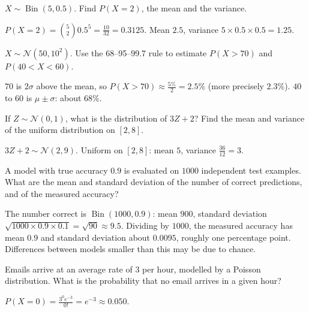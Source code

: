 \sectionexercises

\begin{exercise}
$X \sim \operatorname{Bin}(5, 0.5)$. Find $P(X = 2)$, the mean and the variance.
\end{exercise}
\begin{solution}
$P(X = 2) = \binom52 0.5^5 = \tfrac{10}{32} = 0.3125$. Mean $2.5$, variance
$5\times0.5\times0.5 = 1.25$.
\end{solution}

\begin{exercise}
$X \sim \mathcal{N}(50, 10^2)$. Use the 68--95--99.7 rule to estimate $P(X > 70)$
and $P(40 < X < 60)$.
\end{exercise}
\begin{solution}
$70$ is $2\sigma$ above the mean, so $P(X > 70) \approx \tfrac{5\%}{2} = 2.5\%$
(more precisely $2.3\%$). $40$ to $60$ is $\mu \pm \sigma$: about $68\%$.
\end{solution}

\begin{exercise}
If $Z \sim \mathcal{N}(0, 1)$, what is the distribution of $3Z + 2$? Find the mean
and variance of the uniform distribution on $[2, 8]$.
\end{exercise}
\begin{solution}
$3Z + 2 \sim \mathcal{N}(2, 9)$. Uniform on $[2, 8]$: mean $5$, variance
$\tfrac{36}{12} = 3$.
\end{solution}

\begin{exercise}
A model with true accuracy $0.9$ is evaluated on $1000$ independent test
examples. What are the mean and standard deviation of the number of correct
predictions, and of the measured accuracy?
\end{exercise}
\begin{solution}
The number correct is $\operatorname{Bin}(1000, 0.9)$: mean $900$, standard
deviation $\sqrt{1000\times0.9\times0.1} = \sqrt{90} \approx 9.5$. Dividing by
$1000$, the measured accuracy has mean $0.9$ and standard deviation about
$0.0095$, roughly one percentage point. Differences between models smaller than
this may be due to chance.
\end{solution}

\begin{exercise}
Emails arrive at an average rate of $3$ per hour, modelled by a Poisson
distribution. What is the probability that no email arrives in a given hour?
\end{exercise}
\begin{solution}
$P(X = 0) = \tfrac{3^0e^{-3}}{0!} = e^{-3} \approx 0.050$.
\end{solution}

